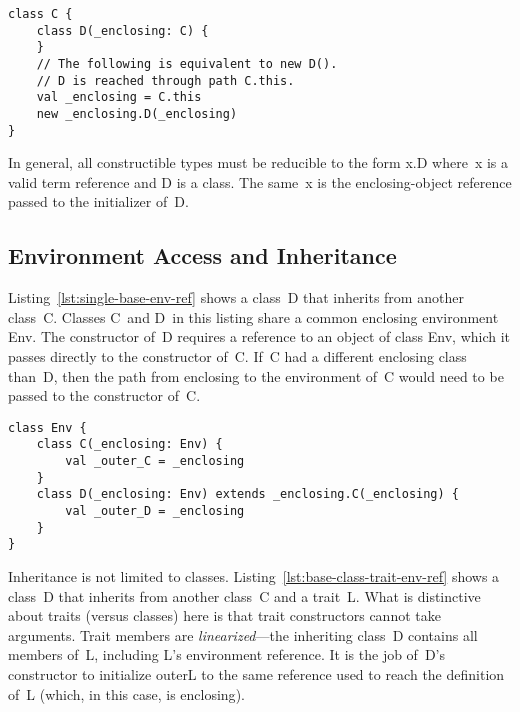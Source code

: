 \begin{lstlisting}[float=htbp, caption={Path Dependence and Enclosing References}, label={lst:new-path-dep}]
class C {
	class D(_enclosing: C) {
	}
	// The following is equivalent to new D().
	// D is reached through path C.this.
	val _enclosing = C.this
	new _enclosing.D(_enclosing)
}
\end{lstlisting}

In general, all constructible types must be reducible to the form \mbox{\cd x.D} where~{\cd x} is a valid term reference and {\cd D} is a class. The same~{\cd x} is the enclosing-object reference passed to the initializer of~{\cd D}.





\subsection{Environment Access and Inheritance}

Listing~\ref{lst:single-base-env-ref} shows a class~{\cd D} that inherits from another class~{\cd C}. Classes {\cd C}~and {\cd D}~in this listing share a common enclosing environment {\cd Env}. The constructor of~{\cd D} requires a reference to an object of class {\cd Env}, which it passes directly to the constructor of~{\cd C}. If~{\cd C} had a different enclosing class than~{\cd D}, then the path from {\cd \und enclosing} to the environment of~{\cd C} would need to be passed to the constructor of~{\cd C}. 



\begin{lstlisting}[float=htbp, caption={Single Base Class with Environment Reference}, label={lst:single-base-env-ref}]
class Env {
	class C(_enclosing: Env) {
		val _outer_C = _enclosing
	}
	class D(_enclosing: Env) extends _enclosing.C(_enclosing) {
		val _outer_D = _enclosing
	}
}
\end{lstlisting}

Inheritance is not limited to classes.
Listing~\ref{lst:base-class-trait-env-ref} shows a class~{\cd D} that inherits from another class~{\cd C} and a trait~{\cd L}. What is distinctive about traits (versus classes) here is that trait constructors cannot take arguments. Trait members are {\em linearized}---the inheriting class~{\cd D} contains all members of~{\cd L}, including \mbox{{\cd L}'s} environment reference. It is the job of~\mbox{{\cd D}'s} constructor to initialize {\cd \und outer\und L} to the same reference used to reach the definition of~{\cd L} (which, in this case, is {\cd \und enclosing}).

